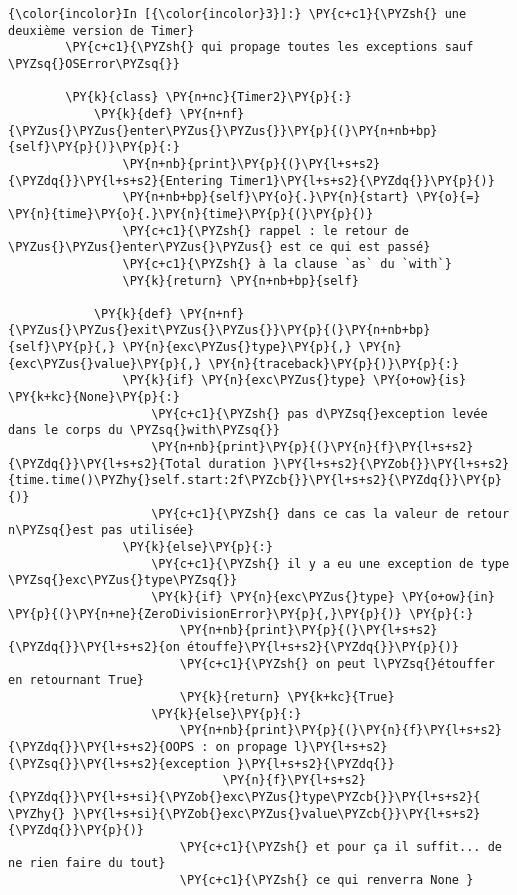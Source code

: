     \begin{Verbatim}[commandchars=\\\{\},frame=single,framerule=0.3mm,rulecolor=\color{cellframecolor}]
{\color{incolor}In [{\color{incolor}3}]:} \PY{c+c1}{\PYZsh{} une deuxième version de Timer}
        \PY{c+c1}{\PYZsh{} qui propage toutes les exceptions sauf \PYZsq{}OSError\PYZsq{}}
        
        \PY{k}{class} \PY{n+nc}{Timer2}\PY{p}{:}
            \PY{k}{def} \PY{n+nf}{\PYZus{}\PYZus{}enter\PYZus{}\PYZus{}}\PY{p}{(}\PY{n+nb+bp}{self}\PY{p}{)}\PY{p}{:}
                \PY{n+nb}{print}\PY{p}{(}\PY{l+s+s2}{\PYZdq{}}\PY{l+s+s2}{Entering Timer1}\PY{l+s+s2}{\PYZdq{}}\PY{p}{)}
                \PY{n+nb+bp}{self}\PY{o}{.}\PY{n}{start} \PY{o}{=} \PY{n}{time}\PY{o}{.}\PY{n}{time}\PY{p}{(}\PY{p}{)}
                \PY{c+c1}{\PYZsh{} rappel : le retour de \PYZus{}\PYZus{}enter\PYZus{}\PYZus{} est ce qui est passé}
                \PY{c+c1}{\PYZsh{} à la clause `as` du `with`}
                \PY{k}{return} \PY{n+nb+bp}{self}
            
            \PY{k}{def} \PY{n+nf}{\PYZus{}\PYZus{}exit\PYZus{}\PYZus{}}\PY{p}{(}\PY{n+nb+bp}{self}\PY{p}{,} \PY{n}{exc\PYZus{}type}\PY{p}{,} \PY{n}{exc\PYZus{}value}\PY{p}{,} \PY{n}{traceback}\PY{p}{)}\PY{p}{:}
                \PY{k}{if} \PY{n}{exc\PYZus{}type} \PY{o+ow}{is} \PY{k+kc}{None}\PY{p}{:}
                    \PY{c+c1}{\PYZsh{} pas d\PYZsq{}exception levée dans le corps du \PYZsq{}with\PYZsq{}}
                    \PY{n+nb}{print}\PY{p}{(}\PY{n}{f}\PY{l+s+s2}{\PYZdq{}}\PY{l+s+s2}{Total duration }\PY{l+s+s2}{\PYZob{}}\PY{l+s+s2}{time.time()\PYZhy{}self.start:2f\PYZcb{}}\PY{l+s+s2}{\PYZdq{}}\PY{p}{)}
                    \PY{c+c1}{\PYZsh{} dans ce cas la valeur de retour n\PYZsq{}est pas utilisée}
                \PY{k}{else}\PY{p}{:}
                    \PY{c+c1}{\PYZsh{} il y a eu une exception de type \PYZsq{}exc\PYZus{}type\PYZsq{}}
                    \PY{k}{if} \PY{n}{exc\PYZus{}type} \PY{o+ow}{in} \PY{p}{(}\PY{n+ne}{ZeroDivisionError}\PY{p}{,}\PY{p}{)} \PY{p}{:}
                        \PY{n+nb}{print}\PY{p}{(}\PY{l+s+s2}{\PYZdq{}}\PY{l+s+s2}{on étouffe}\PY{l+s+s2}{\PYZdq{}}\PY{p}{)}
                        \PY{c+c1}{\PYZsh{} on peut l\PYZsq{}étouffer en retournant True}
                        \PY{k}{return} \PY{k+kc}{True}
                    \PY{k}{else}\PY{p}{:}
                        \PY{n+nb}{print}\PY{p}{(}\PY{n}{f}\PY{l+s+s2}{\PYZdq{}}\PY{l+s+s2}{OOPS : on propage l}\PY{l+s+s2}{\PYZsq{}}\PY{l+s+s2}{exception }\PY{l+s+s2}{\PYZdq{}}
                              \PY{n}{f}\PY{l+s+s2}{\PYZdq{}}\PY{l+s+si}{\PYZob{}exc\PYZus{}type\PYZcb{}}\PY{l+s+s2}{ \PYZhy{} }\PY{l+s+si}{\PYZob{}exc\PYZus{}value\PYZcb{}}\PY{l+s+s2}{\PYZdq{}}\PY{p}{)}
                        \PY{c+c1}{\PYZsh{} et pour ça il suffit... de ne rien faire du tout}
                        \PY{c+c1}{\PYZsh{} ce qui renverra None }
\end{Verbatim}


